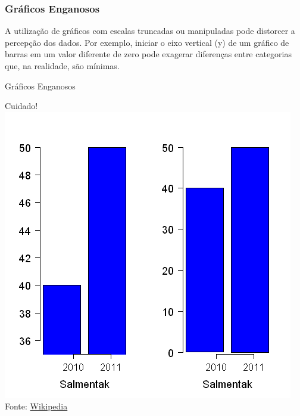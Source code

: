 \documentclass[14pt,aspectratio=1610]{beamer}
\begin{document}
\begin{frame}{}
	\frametitle{Gráficos Enganosos}
	\begin{block}{}
		\justifying
		A utilização de gráficos com escalas truncadas ou manipuladas pode distorcer a percepção dos dados. Por exemplo, iniciar o eixo vertical (y) de um gráfico de barras em um valor diferente de zero pode exagerar diferenças entre categorias que, na rea\-li\-da\-de, são mínimas. 
	\end{block}
\end{frame}


\begin{frame}{Gráficos Enganosos}
	\begin{block}{Cuidado!}
		\centering
		\includegraphics[width=0.5\linewidth]{figs/Enganoso1.png}
		\tiny Fonte: \href{https://pt.wikipedia.org/wiki/Gráfico\_enganoso}{Wikipedia}
	\end{block}
\end{frame}
\end{document}
